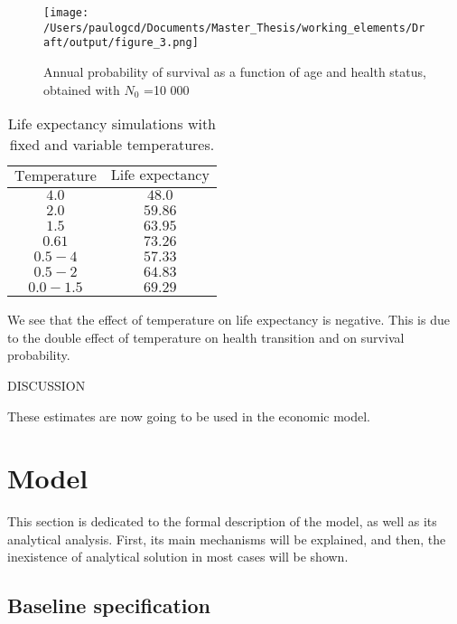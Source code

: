 \documentclass{article}
\begin{document}
\begin{figure}[H]
    \texttt{[image: /Users/paulogcd/Documents/Master\_Thesis/working\_elements/Draft/output/figure\_3.png]}
    \caption{Annual probability of survival as a function of age and health status, obtained with $N_0$ =10 000 }
\end{figure}

\begin{table}[H]
    \begin{center}
        \begin{tabular}{cc}
            \toprule
            $\text{Temperature}$ & $\text{Life expectancy}$\\
            \midrule
            $4.0$ & $48.0$\\
            $2.0$ & $59.86$\\
            $1.5$ & $63.95$\\
            $0.61$ & $73.26$\\
            $0.5 - 4$ & $57.33$\\
            $0.5 - 2$ & $64.83$\\
            $0.0 - 1.5$ & $69.29$\\
            \bottomrule
        \end{tabular}
        \caption{Life expectancy simulations with fixed and variable temperatures.}
    \end{center}
\end{table}

We see that the effect of temperature on life expectancy 
is negative. 
This is due to the double effect of temperature on 
health transition and on survival probability.

DISCUSSION

These estimates are now going to be used in 
the economic model.

\section{Model}

This section is dedicated to the formal description of 
the model, as well as its analytical analysis.
First, its main mechanisms will be explained, and then, the 
inexistence of analytical solution in most cases will be shown.

\subsection{Baseline specification }
\end{document}

